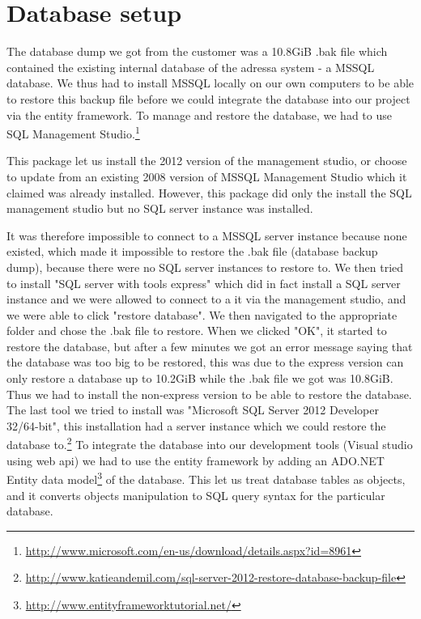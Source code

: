 \chapter{Database setup}\label{dbSetup}
The database dump we got from the customer was a 10.8GiB .bak file which contained the existing internal database of the adressa system - a MSSQL database.
We thus had to install MSSQL locally on our own computers to be able to restore this backup file before we could integrate the database into our project via the entity framework. To manage and restore the database, we had to use SQL Management Studio.\footnote{\href{http://www.microsoft.com/en-us/download/details.aspx?id=8961}{http://www.microsoft.com/en-us/download/details.aspx?id=8961}}

This package let us install the 2012 version of the management studio, or choose to update from an existing 2008 version of MSSQL Management Studio which it claimed was already installed. However, this package did only the install the SQL management studio but no SQL server instance was installed.

It was therefore impossible to connect to a MSSQL server instance because none existed, which made it impossible to restore the .bak file (database backup dump), because there were no SQL server instances to restore to.
We then tried to install "SQL server with tools express" which did in fact install a SQL server instance and we were allowed to connect to a it via the management studio, and we were able to click "restore database". We then navigated to the appropriate folder and chose the .bak file to restore. When we clicked "OK", it started to restore the database, but after a few minutes we got an error message saying that the database was too big to be restored, this was due to the express version can only restore a database up to 10.2GiB while the .bak file we got was 10.8GiB. Thus we had to install the non-express version to be able to restore the database. The last tool we tried to install was "Microsoft SQL Server 2012 Developer 32/64-bit", this installation had a server instance which we could restore the database to.\footnote{\href{http://www.katieandemil.com/sql-server-2012-restore-database-backup-file}{http://www.katieandemil.com/sql-server-2012-restore-database-backup-file}}
To integrate the database into our development tools (Visual studio using web api) we had to use the entity framework by adding an ADO.NET Entity data model\footnote{\href{http://www.entityframeworktutorial.net/EntityFramework5/entity-framework5-introduction.aspx}{http://www.entityframeworktutorial.net/}} of the database.
This let us treat database tables as objects, and it converts objects manipulation to SQL query syntax for the particular database.